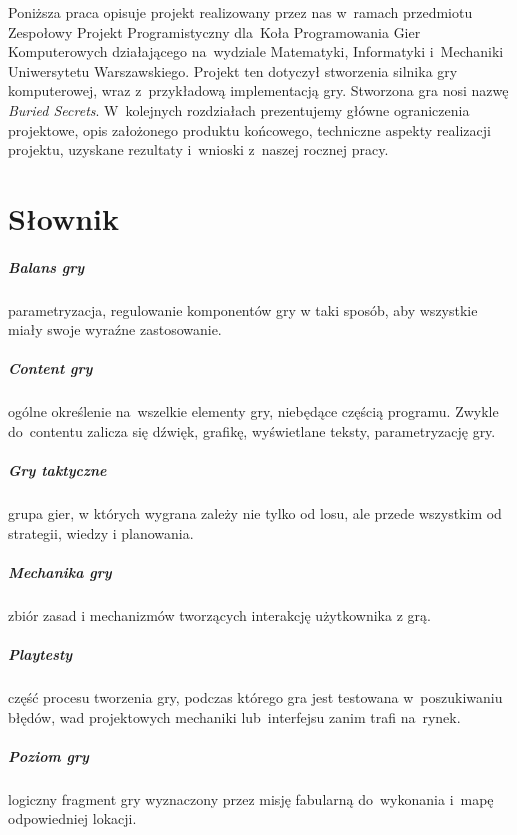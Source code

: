 \documentclass[licencjacka]{pracamgr}
\begin{document}
  Poniższa praca opisuje projekt realizowany przez nas w~ramach przedmiotu Zespołowy Projekt Programistyczny dla~Koła
  Programowania Gier Komputerowych\cite{PROGRY} działającego na~wydziale Matematyki, Informatyki i~Mechaniki Uniwersytetu
  Warszawskiego. Projekt ten dotyczył stworzenia silnika gry komputerowej, wraz z~przykładową implementacją gry.
  Stworzona gra nosi nazwę \emph{Buried Secrets}. W~kolejnych rozdziałach prezentujemy główne ograniczenia projektowe,
  opis założonego produktu końcowego, techniczne aspekty realizacji projektu, uzyskane rezultaty i~wnioski z~naszej
  rocznej pracy.

\chapter{Słownik}
  \paragraph{Balans gry}
    parametryzacja, regulowanie komponentów gry w taki sposób, aby wszystkie miały swoje wyraźne zastosowanie.
  \paragraph{Content gry}
    ogólne określenie na~wszelkie elementy gry, niebędące częścią programu. Zwykle do~contentu zalicza się dźwięk,
    grafikę, wyświetlane teksty, parametryzację gry.
  \paragraph{Gry taktyczne}
    grupa gier, w których wygrana zależy nie tylko od losu, ale przede wszystkim od strategii, wiedzy i planowania.
  \paragraph{Mechanika gry}
    zbiór zasad i mechanizmów tworzących interakcję użytkownika z grą. 
  \paragraph{Playtesty}
    część procesu tworzenia gry, podczas którego gra jest testowana w~poszukiwaniu błędów, wad projektowych mechaniki
    lub~interfejsu zanim trafi na~rynek.
  \paragraph{Poziom gry}
    logiczny fragment gry wyznaczony przez misję fabularną do~wykonania i~mapę odpowiedniej lokacji.
\end{document}
